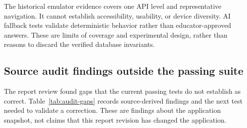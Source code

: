 \documentclass[12pt,a4paper,oneside]{report}
\begin{document}
The historical emulator evidence covers one API level and representative navigation.
It cannot establish accessibility, usability, or device diversity. AI fallback tests
validate deterministic behavior rather than educator-approved answers. These are limits
of coverage and experimental design, rather than reasons to discard the verified
database invariants.

\subsection{Source audit findings outside the passing suite}
\label{sec:audit-findings}
The report review found gaps that the current passing tests do not establish as
correct. Table~\ref{tab:audit-gaps} records source-derived findings and the next
test needed to validate a correction. These are findings about the application
snapshot, not claims that this report revision has changed the application.
\end{document}
